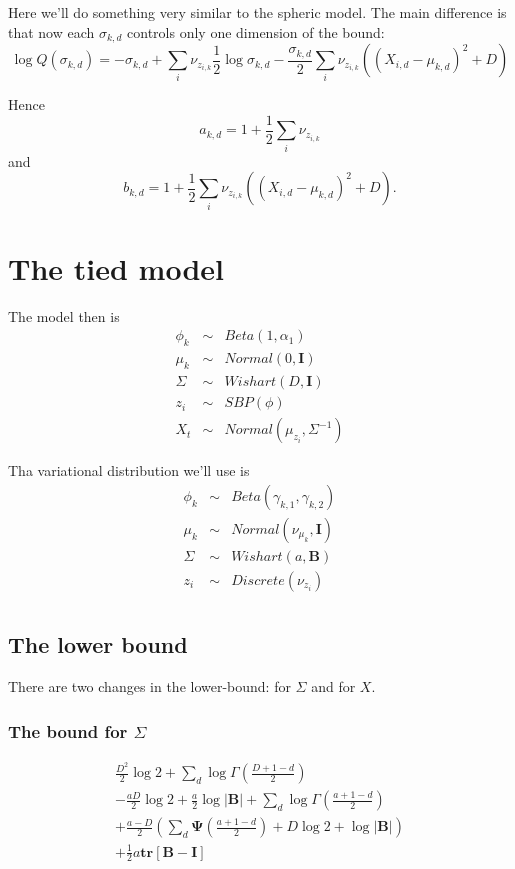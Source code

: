 \documentclass{article}
\newcommand{\digamma}{\bm{\Psi}}
\newcommand{\m}[1]{\nu_{#1}}
\begin{document}
Here we'll do something very similar to the spheric model. The main
difference is that now each $\sigma_{k,d}$ controls only one dimension
of the bound:
\[
\log Q(\sigma_{k,d}) = -\sigma_{k,d} + \sum_i \m{z_{i,k}}\frac{1}{2}\log \sigma_{k,d} 
- \frac{\sigma_{k,d}}{2}\sum_i \m{z_{i,k}} ((X_{i,d}-\mu_{k,d})^2 + D)
\]

Hence 
\[
a_{k,d} = 1 + \frac{1}{2} \sum_i \m{z_{i,k}}
\]
and
\[
b_{k,d} = 1 + \frac{1}{2} \sum_i \m{z_{i,k}}((X_{i,d}-\mu_{k,d})^2 + D).
\]

\section{The tied model}
\label{sec:tied-model}

 The model then is
\begin{eqnarray*}
  \phi_k   &\sim& Beta(1, \alpha_1) \\
  \mu_k   &\sim& Normal(0,  \mathbf{I}) \\
  \Sigma &\sim& Wishart(D, \mathbf{I}) \\
  z_{i}     &\sim& SBP(\phi) \\
  X_t &\sim& Normal(\mu_{z_i},  \Sigma^{-1})
\end{eqnarray*}

Tha variational distribution we'll use is
\begin{eqnarray*}
  \phi_k   &\sim& Beta(\gamma_{k,1}, \gamma_{k,2}) \\
  \mu_k   &\sim& Normal(\m{\mu_k},  \mathbf{I}) \\
  \Sigma &\sim& Wishart(a, \mathbf{B}) \\
  z_{i}     &\sim& Discrete(\m{z_i}) \\
\end{eqnarray*}

\subsection{The lower bound}
\label{sec:lower-bound-1}

There are two changes in the lower-bound: for $\Sigma$ and for $X$.

\subsubsection{The bound for $\Sigma$}
\label{sec:bound-sigma}

\begin{eqnarray*}
  \frac{D^2}{2}\log 2  + \sum_d \log \Gamma(\frac{D+1-d}{2}) \\
  - \frac{aD}{2}\log 2 + \frac{a}{2} \log |\mathbf{B}| + \sum_d \log \Gamma(\frac{a+1-d}{2}) \\
  + \frac{a-D}{2}\left(\sum_d \digamma\left(\frac{a+1-d}{2}\right) 
    + D \log 2 + \log |\mathbf{B}|\right) \\
  + \frac{1}{2} a \mathbf{tr}[\mathbf{B}-\mathbf{I}]
\end{eqnarray*}
\end{document}
